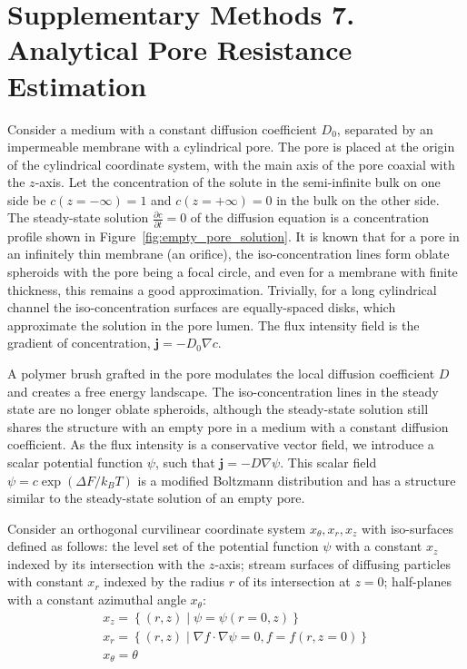 \documentclass[10pt, a4paper]{article}
\begin{document}
\section{Supplementary Methods 7. Analytical Pore Resistance Estimation}
\begin{multicols}{2}



Consider a medium with a constant diffusion coefficient $D_0$, separated by an impermeable membrane with a cylindrical pore.
The pore is placed at the origin of the cylindrical coordinate system, with the main axis of the pore coaxial with the $z$-axis.
Let the concentration of the solute in the semi-infinite bulk on one side be $c(z = -\infty) = 1$ and $c(z = +\infty) = 0$ in the bulk on the other side.
The steady-state solution $\frac{\partial c}{\partial t} = 0$ of the diffusion equation is a concentration profile shown in Figure~\ref{fig:empty_pore_solution}.
It is known that for a pore in an infinitely thin membrane (an orifice), the iso-concentration lines form oblate spheroids with the pore being a focal circle, and even for a membrane with finite thickness, this remains a good approximation.
Trivially, for a long cylindrical channel the iso-concentration surfaces are equally-spaced disks, which approximate the solution in the pore lumen.
The flux intensity field is the gradient of concentration, $\mathbf{j} = -D_0 \nabla c$.

A polymer brush grafted in the pore modulates the local diffusion coefficient $D$ and creates a free energy landscape.
The iso-concentration lines in the steady state are no longer oblate spheroids, although the steady-state solution still shares the structure with an empty pore in a medium with a constant diffusion coefficient.
As the flux intensity is a conservative vector field, we introduce a scalar potential function $\psi$, such that $\mathbf{j} = -D \nabla \psi$.
This scalar field $\psi = c \exp(\Delta F / k_B T)$ is a modified Boltzmann distribution and has a structure similar to the steady-state solution of an empty pore.

Consider an orthogonal curvilinear coordinate system $x_{\theta}, x_{r}, x_{z}$ with iso-surfaces defined as follows:
the level set of the potential function $\psi$ with a constant $x_{z}$ indexed by its intersection with the $z$-axis;
stream surfaces of diffusing particles with constant $x_{r}$ indexed by the radius $r$ of its intersection at $z = 0$;
half-planes with a constant azimuthal angle $x_{\theta}$:
\begin{gather}
    x_z = \left\{ (r, z) \mid \psi = \psi(r = 0, z) \right\}
    \\
    x_r = \left\{ (r, z) \mid \nabla f \cdot \nabla \psi = 0, f = f(r, z = 0) \right\}
    \\
    x_{\theta} = \theta
\end{gather}


\end{multicols}
\end{document}
